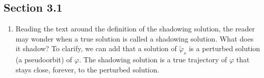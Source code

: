\documentclass[12pt]{article}
\begin{document}
\subsection*{Section 3.1}
\begin{enumerate}
    \item Reading the text around the definition of the shadowing solution, 
    the reader may wonder when a true solution is called a shadowing solution.
    What does it shadow? To clarify, we can add that a solution of $\tilde{\varphi}_s$
    is a perturbed solution (a pseudoorbit) of $\varphi.$ The shadowing solution 
    is a true trajectory of $\varphi$ that stays close, forever, to the perturbed solution.
\end{enumerate}
\end{document}
